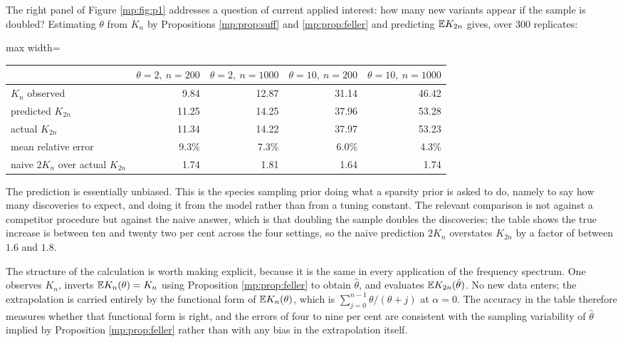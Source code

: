 The right panel of Figure \ref{mp:fig:p1} addresses a question of current applied interest: how
many new variants appear if the sample is doubled? Estimating $\theta$ from $K_n$ by
Propositions \ref{mp:prop:suff} and \ref{mp:prop:feller} and predicting $\mathbb{E} K_{2n}$ gives, over
300 replicates:

\begin{center}
\begin{adjustbox}{max width=\textwidth}
\begin{tabular}{lrrrr}
\toprule
& $\theta=2,\ n=200$ & $\theta=2,\ n=1000$ & $\theta=10,\ n=200$ & $\theta=10,\ n=1000$ \\
\midrule
$K_n$ observed      & 9.84  & 12.87 & 31.14 & 46.42 \\
predicted $K_{2n}$  & 11.25 & 14.25 & 37.96 & 53.28 \\
actual $K_{2n}$     & 11.34 & 14.22 & 37.97 & 53.23 \\
mean relative error & 9.3\% & 7.3\% & 6.0\% & 4.3\% \\
naive $2K_n$ over actual $K_{2n}$ & 1.74 & 1.81 & 1.64 & 1.74 \\
\bottomrule
\end{tabular}
\end{adjustbox}
\end{center}

The prediction is essentially unbiased. This is the species sampling prior doing what a
sparsity prior is asked to do, namely to say how many discoveries to expect, and doing it
from the model rather than from a tuning constant. The relevant comparison is not against a
competitor procedure but against the naive answer, which is that doubling the sample doubles
the discoveries; the table shows the true increase is between ten and twenty two per
cent across the four settings, so the naive prediction $2K_n$ overstates $K_{2n}$ by a factor
of between $1.6$ and $1.8$.

The structure of the calculation is worth making explicit, because it is the same in every
application of the frequency spectrum. One observes $K_n$, inverts $\mathbb{E} K_n(\theta)=K_n$ using
Proposition \ref{mp:prop:feller} to obtain $\hat\theta$, and evaluates $\mathbb{E} K_{2n}(\hat\theta)$.
No new data enters; the extrapolation is carried entirely by the functional form of
$\mathbb{E} K_n(\theta)$, which is $\sum_{j=0}^{n-1}\theta/(\theta+j)$ at $\alpha=0$. The accuracy in
the table therefore measures whether that functional form is right, and the errors of four to
nine per cent are consistent with the sampling variability of $\hat\theta$ implied by
Proposition \ref{mp:prop:feller} rather than with any bias in the extrapolation itself.

